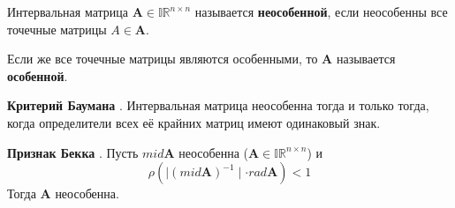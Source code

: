 \begin{definition}
	Интервальная матрица $\mathbf{A} \in \mathbb{IR}^{n \times n}$ называется \textbf{неособенной}, 
	если неособенны все точечные матрицы $A \in \mathbf{A}$. 
\end{definition}

\begin{definition}
	Если же все точечные матрицы являются особенными, то  $\mathbf{A}$ называется \textbf{особенной}.
\end{definition}

\begin{theorem}
	\textbf{Критерий Баумана} \cite{bazhenov}. Интервальная матрица неособенна тогда и только тогда, когда определители всех её крайних матриц имеют одинаковый знак.
\end{theorem}


\begin{theorem}
	\textbf{Признак Бекка} \cite{bazhenov}. Пусть $mid \mathbf{A}$ неособенна ($\mathbf{A} \in \mathbb{IR}^{n \times n}$) и
	$$\rho(\mid (mid \mathbf{A})^{-1} \mid \cdot rad \mathbf{A}) < 1$$
	Тогда $\mathbf{A}$ неособенна.
\end{theorem}
